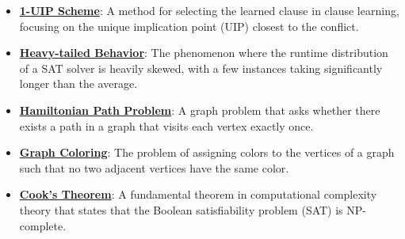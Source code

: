 \documentclass{article}%
\begin{document}
\begin{itemize}[leftmargin=*]
\item \href{https://purdue.brightspace.com/d2l/common/assets/pdfjs-d2l-dist/1.0.14-legacy/web/viewer.html?file=\%2Fcontent\%2Fenforced\%2F1095467-wl.202510.CS.24300.001\%2F15L2-SAT.pdf\%3Fou\%3D1095467\&lang=en-us\&container=d2l-fileviewer-rendered-pdf\&fullscreen=d2l-fileviewer-rendered-pdf-dialog\&height=667#page=35}{\textbf{1{-}UIP Scheme}}: A method for selecting the learned clause in clause learning, focusing on the unique implication point (UIP) closest to the conflict.%
\item \href{https://purdue.brightspace.com/d2l/common/assets/pdfjs-d2l-dist/1.0.14-legacy/web/viewer.html?file=\%2Fcontent\%2Fenforced\%2F1095467-wl.202510.CS.24300.001\%2F15L2-SAT.pdf\%3Fou\%3D1095467\&lang=en-us\&container=d2l-fileviewer-rendered-pdf\&fullscreen=d2l-fileviewer-rendered-pdf-dialog\&height=667#page=35}{\textbf{Heavy{-}tailed Behavior}}: The phenomenon where the runtime distribution of a SAT solver is heavily skewed, with a few instances taking significantly longer than the average.%
\item \href{https://purdue.brightspace.com/d2l/common/assets/pdfjs-d2l-dist/1.0.14-legacy/web/viewer.html?file=\%2Fcontent\%2Fenforced\%2F1095467-wl.202510.CS.24300.001\%2F15L2-SAT.pdf\%3Fou\%3D1095467\&lang=en-us\&container=d2l-fileviewer-rendered-pdf\&fullscreen=d2l-fileviewer-rendered-pdf-dialog\&height=667#page=40}{\textbf{Hamiltonian Path Problem}}: A graph problem that asks whether there exists a path in a graph that visits each vertex exactly once.%
\item \href{https://purdue.brightspace.com/d2l/common/assets/pdfjs-d2l-dist/1.0.14-legacy/web/viewer.html?file=\%2Fcontent\%2Fenforced\%2F1095467-wl.202510.CS.24300.001\%2F15L2-SAT.pdf\%3Fou\%3D1095467\&lang=en-us\&container=d2l-fileviewer-rendered-pdf\&fullscreen=d2l-fileviewer-rendered-pdf-dialog\&height=667#page=47}{\textbf{Graph Coloring}}: The problem of assigning colors to the vertices of a graph such that no two adjacent vertices have the same color.%
\item \href{https://purdue.brightspace.com/d2l/common/assets/pdfjs-d2l-dist/1.0.14-legacy/web/viewer.html?file=\%2Fcontent\%2Fenforced\%2F1095467-wl.202510.CS.24300.001\%2F15L2-SAT.pdf\%3Fou\%3D1095467\&lang=en-us\&container=d2l-fileviewer-rendered-pdf\&fullscreen=d2l-fileviewer-rendered-pdf-dialog\&height=667#page=54}{\textbf{Cook's Theorem}}: A fundamental theorem in computational complexity theory that states that the Boolean satisfiability problem (SAT) is NP-complete.%
\end{itemize}%
\end{document}
